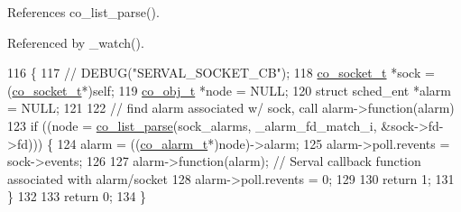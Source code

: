 References co\-\_\-list\-\_\-parse().



Referenced by \-\_\-watch().


\begin{DoxyCode}
116                                                         \{
117 \textcolor{comment}{//   DEBUG("SERVAL\_SOCKET\_CB");}
118   \hyperlink{structco__socket__t}{co\_socket\_t} *sock = (\hyperlink{structco__socket__t}{co\_socket\_t}*)\textcolor{keyword}{self};
119   \hyperlink{structco__obj__t}{co\_obj\_t} *node = NULL;
120   \textcolor{keyword}{struct }sched\_ent *alarm = NULL;
121   
122   \textcolor{comment}{// find alarm associated w/ sock, call alarm->function(alarm)}
123   \textcolor{keywordflow}{if} ((node = \hyperlink{list_8c_a53067bb4fab9f78bdc6e69381bbccd16}{co\_list\_parse}(sock\_alarms, \_alarm\_fd\_match\_i, &sock->fd->fd))) \{
124     alarm = ((\hyperlink{structco__alarm__t}{co\_alarm\_t}*)node)->alarm;
125     alarm->poll.revents = sock->events;
126     
127     alarm->function(alarm); \textcolor{comment}{// Serval callback function associated with alarm/socket}
128     alarm->poll.revents = 0;
129     
130     \textcolor{keywordflow}{return} 1;
131   \}
132   
133   \textcolor{keywordflow}{return} 0;
134 \}
\end{DoxyCode}
